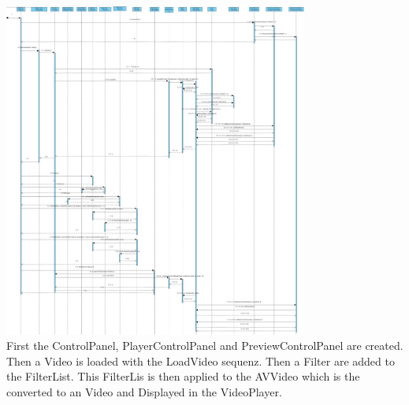 \documentclass[twoside]{book}
\newcommand{\+}{\discretionary{\mbox{\scriptsize$\hookleftarrow$}}{}{}}
\begin{document}
\newpage
{\centering\includegraphics[width=10cm]{Sequence Diagram3.jpg}}\\
First the ControlPanel, PlayerControlPanel and PreviewControlPanel are created.
Then a Video is loaded with the LoadVideo sequenz. Then a Filter are added to the FilterList. This FilterLis is then applied to the AVVideo which is the converted to an Video and Displayed in the VideoPlayer. 
\end{document}
